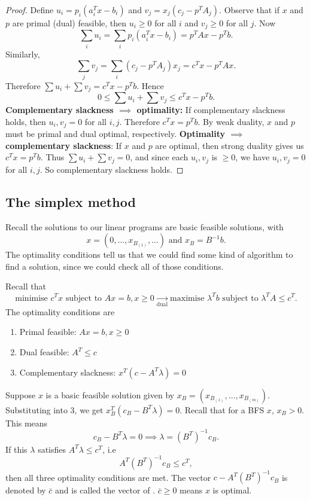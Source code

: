 \documentclass[a4paper]{scrartcl}
\begin{document}
\begin{proof}
	 Define $u_i=p_i (a_i^T x - b_i)$ and $v_j=x_j(c_j-p^T A_j)$.\newline 
	 Observe that if $x$ and $p$ are primal (dual) feasible, then $u_i \geq 0$ for all $i$ and $v_j \geq 0$ for all $j$. Now 
	 \[\sum_{i}u_i=\sum_{i} p_i (a_i^T x - b_i) =p^T A x-p^T b.\]
	 Similarly,
	 \[\sum_{j}v_j=\sum_{i} (c_j-p^T A_j)x_j =c^Tx-p^T A x.\]
	 Therefore $\sum u_i+ \sum v_j=c^T x -p^T b$. Hence 
	 \[0 \leq \sum u_i+ \sum v_j \leq c^T x -p^T b.\]
	 \textbf{Complementary slackness $\implies $ optimality:}\newline 
	 If complementary slackness holds, then $u_i,v_j=0$ for all $i,j$. Therefore $c^T x=p^T b$. By weak duality, $x$ and $p$ must be primal and dual optimal, respectively.\newline 
	 \textbf{Optimality $\implies $ complementary slackness}:\newline 
	 If $x$ and $p$ are optimal, then strong duality gives us $c^T x =p^T b$. Thus $\sum u_i+ \sum v_j=0$, and since each $u_i,v_j$ is $\geq 0$, we have $u_i, v_j=0$ for all $i,j$. So complementary slackness holds.
\end{proof}

\subsection{The simplex method}
Recall the solutions to our linear programs are basic feasible solutions, with 
\[x=(0,\ldots,x_{B_{(1)}},\ldots) \text{ and } x_B =B^{-1}b.\]
The optimality conditions tell us that we could find some kind of algorithm to find a solution, since we could check all of those conditions.

Recall that 
\[\text{minimise }c^Tx \text{ subject to } Ax=b, x \geq 0 \underset{\text{dual} }{\to}  \text{maximise }\lambda^T b \text{ subject to } \lambda^TA \leq c^T.\]
The optimality conditions are 
\begin{enumerate}
	\item Primal feasible: $Ax=b, x \geq 0$
	\item Dual feasible: $A^T \leq c$
	\item Complementary slackness: $x^T (c-A^T \lambda)=0$
\end{enumerate}
Suppose $x$ is a basic feasible solution given by $x_B=(x_{B_{(1)}},\ldots ,x_{B_{(m)}})$. Substituting into 3, we get $x_B^T (c_B-B^T \lambda)=0$. Recall that for a BFS $x$, $x_B>0$. This means 
\[c_B-B^T\lambda=0 \implies \lambda={(B^T)}^{-1}c_B.\]
If this $\lambda$ satisfies $A^T \lambda \leq c^T$, i.e 
\[A^T {(B^T)}^{-1} c_B \leq c^T,\]
then all three optimality conditions are met. The vector $c-A^T {(B^T)}^{-1}c_B$ is denoted by $\bar{c}$ and is called the vector of . $\bar{c} \geq 0$ means $x$ is optimal.
\end{document}
